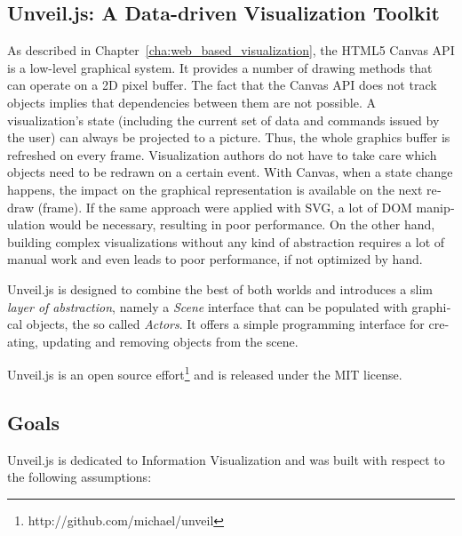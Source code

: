 \begin{english}

\chapter{Unveil.js: A Data-driven Visualization Toolkit}
\label{cha:unveil}


As described in Chapter~\ref{cha:web_based_visualization}, the HTML5 Canvas API is a low-level graphical system. It provides a number of drawing methods that can operate on a 2D pixel buffer. The fact that the Canvas API does not track objects implies that dependencies between them are not possible. A visualization's state (including the current set of data and commands issued by the user) can always be projected to a picture. Thus, the whole graphics buffer is refreshed on every frame. Visualization authors do not have to take care which objects need to be redrawn on a certain event. With Canvas, when a state change happens, the impact on the graphical representation is available on the next redraw (frame). If the same approach were applied with SVG, a lot of DOM manipulation would be necessary, resulting in poor performance. On the other hand, building complex visualizations without any kind of abstraction requires a lot of manual work and even leads to poor performance, if not optimized by hand.

Unveil.js is designed to combine the best of both worlds and introduces a slim \emph{layer of abstraction}, namely a \emph{Scene} interface that can be populated with graphical objects, the so called \emph{Actors}. It offers a simple programming interface for creating, updating and removing objects from the scene.

Unveil.js is an open source effort\footnote{http://github.com/michael/unveil} and is released under the MIT license.


\section{Goals}

Unveil.js is dedicated to Information Visualization and was built with respect to the following assumptions:


\end{english}
